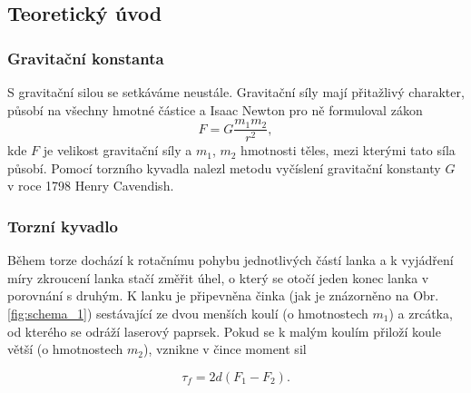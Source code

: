 \documentclass[english]{article}
\begin{document}
	\subsection{Teoretický úvod}
		\subsubsection{Gravitační konstanta}
			S gravitační silou se setkáváme neustále. Gravitační síly mají přitažlivý charakter, působí na všechny hmotné částice a Isaac Newton pro ně formuloval zákon 
			\begin{equation}\label{gravity}
			F=G \frac{m_{1}m_{2}}{r^2},
			\end{equation}
			kde $F$ je velikost gravitační síly a $m_1$, $m_2$ hmotnosti těles, mezi kterými tato síla působí. Pomocí torzního kyvadla nalezl metodu vyčíslení gravitační konstanty $G$ v roce 1798 Henry Cavendish.
			
		\subsubsection{Torzní kyvadlo}
			Během torze dochází k rotačnímu pohybu jednotlivých částí lanka a k vyjádření míry zkroucení lanka stačí změřit úhel, o který se otočí jeden konec lanka v porovnání s druhým. K lanku je připevněna činka (jak je znázorněno na Obr. \ref{fig:schema_1}) sestávající ze dvou menších koulí (o hmotnostech $m_1$) a zrcátka, od kterého se odráží laserový paprsek. Pokud se k malým koulím přiloží koule větší (o hmotnostech $m_2$), vznikne v čince moment sil
			
			\begin{equation}
			\tau_{f} = 2d(F_{1}-F_{2}).
			\end{equation}
			
\end{document}
